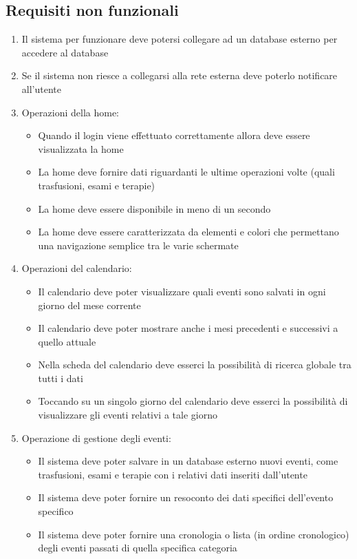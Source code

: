 \documentclass[12pt,a4paper,openright,twoside]{report}
\begin{document}
\subsection{Requisiti non funzionali}
\begin{enumerate}
\item Il sistema per funzionare deve potersi collegare ad un database esterno per accedere al database
\item Se il sistema non riesce a collegarsi alla rete esterna deve poterlo notificare all'utente
\item Operazioni della home:
\begin{itemize}
\item Quando il login viene effettuato correttamente allora deve essere visualizzata la home
\item La home deve fornire dati riguardanti le ultime operazioni volte (quali trasfusioni, esami e terapie)
\item La home deve essere disponibile in meno di un secondo
\item La home deve essere caratterizzata da elementi e colori che permettano una navigazione semplice tra le varie schermate
\end{itemize}
\item Operazioni del calendario:
\begin{itemize}
\item Il calendario deve poter visualizzare quali eventi sono salvati in ogni giorno del mese corrente
\item Il calendario deve poter mostrare anche i mesi precedenti e successivi a quello attuale
\item Nella scheda del calendario deve esserci la possibilità di ricerca globale tra tutti i dati
\item Toccando su un singolo giorno del calendario deve esserci la possibilità di visualizzare gli eventi relativi a tale giorno
\end{itemize}
\item Operazione di gestione degli eventi:
\begin{itemize}
\item Il sistema deve poter salvare in un database esterno nuovi eventi, come trasfusioni, esami e terapie con i relativi dati inseriti dall'utente
\item Il sistema deve poter fornire un resoconto dei dati specifici dell'evento specifico
\item Il sistema deve poter fornire una cronologia o lista (in ordine cronologico) degli eventi passati di quella specifica categoria

\end{itemize}
\end{enumerate}
\end{document}
